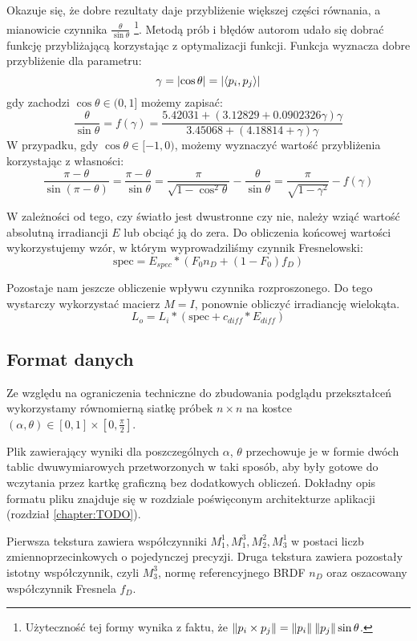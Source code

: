 \documentclass[../main.tex]{subfiles}
\begin{document}
Okazuje się, że dobre rezultaty daje przybliżenie większej części równania, a mianowicie czynnika $\frac{\theta}{\sin\theta}$ \footnote{Użyteczność tej formy wynika z faktu, że $\norm{p_i \times p_j} = \norm{p_i}\:\norm{p_j}\sin\theta$.}. Metodą prób i błędów autorom udało się dobrać funkcję przybliżającą korzystając z optymalizacji funkcji. Funkcja wyznacza dobre przybliżenie dla parametru:
\[
\gamma = \abs{\cos\theta} = \abs{\langle p_i, p_j \rangle}
\]
\noindent gdy zachodzi $\cos\theta \in (0,1]$ możemy zapisać:
\[
\frac{\theta}{\sin\theta} = f(\gamma) = \frac{
    5.42031 + \left( 3.12829 + 0.0902326 \gamma \right) \gamma
}{
    3.45068 + \left( 4.18814 + \gamma \right) \gamma
}
\]
\noindent W przypadku, gdy $\cos\theta \in [-1, 0)$, możemy wyznaczyć wartość przybliżenia korzystając z własności:
\[
    \frac{\pi - \theta}{\sin\left( \pi-\theta \right)} =
    \frac{\pi - \theta}{\sin\theta} = 
    \frac{\pi}{\sqrt{1-\cos^{2}\theta}} - \frac{\theta}{\sin\theta} =
    \frac{\pi}{\sqrt{1-\gamma^2}} - f(\gamma)
\]

W zależności od tego, czy światło jest dwustronne czy nie, należy wziąć wartość absolutną irradiancji $E$ lub obciąć ją do zera. Do obliczenia końcowej wartości wykorzystujemy wzór, w którym wyprowadziliśmy czynnik Fresnelowski:
\[
    \text{spec} = E_{spec} * (F_0 n_D + (1-F_0) f_D)
\]

Pozostaje nam jeszcze obliczenie wpływu czynnika rozproszonego. Do tego wystarczy wykorzystać macierz $M=I$, ponownie obliczyć irradiancję wielokąta. 
\[
    L_o = L_i * \left( \text{spec} + c_{diff}*E_{diff} \right)
\]

\subsection{Format danych}

Ze względu na ograniczenia techniczne do zbudowania podglądu przekształceń wykorzystamy równomierną siatkę próbek $n \times n$ na kostce $(\alpha, \theta) \in \left[0,1\right] \times \left[0, \frac{\pi}{2}\right]$.

Plik zawierający wyniki dla poszczególnych $\alpha$, $\theta$ przechowuje je w formie dwóch tablic dwuwymiarowych przetworzonych w taki sposób, aby były gotowe do wczytania przez kartkę graficzną bez dodatkowych obliczeń. Dokładny opis formatu pliku znajduje się w rozdziale poświęconym architekturze aplikacji (rozdział \ref{chapter:TODO}).

Pierwsza tekstura zawiera współczynniki $M_{1}^{1}, M_{1}^{3}, M_{2}^{2}, M_{3}^{1}$ w postaci liczb zmiennoprzecinkowych o pojedynczej precyzji. Druga tekstura zawiera pozostały istotny współczynnik, czyli $M_{3}^{3}$, normę referencyjnego BRDF $n_D$ oraz oszacowany współczynnik Fresnela $f_D$.
\end{document}
